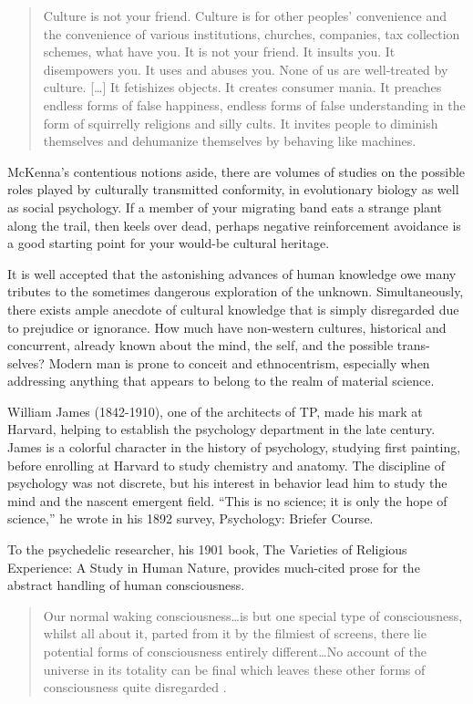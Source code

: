 \documentclass{UIdahoMastersThesis}
\begin{document}
\begin{quote}
{Culture is not your friend. Culture is for other peoples' convenience and the convenience of various institutions, churches, companies, tax collection schemes, what have you. It is not your friend. It insults you. It disempowers you. It uses and abuses you. None of us are well-treated by culture. [\ldots] It fetishizes objects. It creates consumer mania. It preaches endless forms of false happiness, endless forms of false understanding in the form of squirrelly religions and silly cults. It invites people to diminish themselves and dehumanize themselves by behaving like machines.}
\end{quote}

McKenna's contentious notions aside, there are volumes of studies on the possible roles played by culturally transmitted conformity, in evolutionary biology as well as social psychology. If a member of your migrating band eats a strange plant along the trail, then keels over dead, perhaps negative reinforcement avoidance is a good starting point for your would-be cultural heritage.

It is well accepted that the astonishing advances of human knowledge owe many tributes to the sometimes dangerous exploration of the unknown. Simultaneously, there exists ample anecdote of cultural knowledge that is simply disregarded due to prejudice or ignorance. How much have non-western cultures, historical and concurrent, already known about the mind, the self, and the possible trans-selves? Modern man is prone to conceit and ethnocentrism, especially when addressing anything that appears to belong to the realm of material science.

William James (1842-1910), one of the architects of TP, made his mark at Harvard, helping to establish the psychology department in the late  century. James is a colorful character in the history of psychology, studying first painting, before enrolling at Harvard to study chemistry and anatomy. The discipline of psychology was not discrete, but his interest in behavior lead him to study the mind and the nascent emergent field. \enquote{This is no science; it is only the hope of science,} he wrote in his 1892 survey, Psychology: Briefer Course. 

To the psychedelic researcher, his 1901 book, The Varieties of Religious Experience: A Study in Human Nature, provides much-cited prose for the abstract handling of human consciousness.

\begin{quote}
{Our normal waking consciousness\ldots is but one special type of consciousness, whilst all about it, parted from it by the filmiest of screens, there lie potential forms of consciousness entirely different\ldots No account of the universe in its totality can be final which leaves these other forms of consciousness quite disregarded \cite{james1961varieties}.}
\end{quote}
\end{document}
